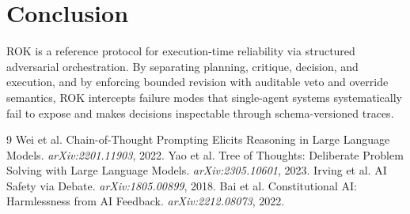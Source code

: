\documentclass[11pt]{article}
\begin{document}
\section*{Conclusion}
ROK is a reference protocol for execution-time reliability via structured adversarial orchestration. By separating planning, critique, decision, and execution, and by enforcing bounded revision with auditable veto and override semantics, ROK intercepts failure modes that single-agent systems systematically fail to expose and makes decisions inspectable through schema-versioned traces.

\begin{thebibliography}{9}
 Wei et al. Chain-of-Thought Prompting Elicits Reasoning in Large Language Models. \emph{arXiv:2201.11903}, 2022.
 Yao et al. Tree of Thoughts: Deliberate Problem Solving with Large Language Models. \emph{arXiv:2305.10601}, 2023.
 Irving et al. AI Safety via Debate. \emph{arXiv:1805.00899}, 2018.
 Bai et al. Constitutional AI: Harmlessness from AI Feedback. \emph{arXiv:2212.08073}, 2022.
\end{thebibliography}
\end{document}
